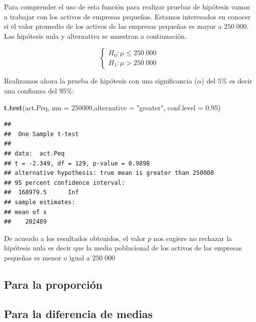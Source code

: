 \documentclass[letterpaper,]{book}
\newenvironment{Shaded}{\begin{snugshade}}{\end{snugshade}}
\newcommand{\DataTypeTok}[1]{\textcolor[rgb]{0.13,0.29,0.53}{#1}}
\newcommand{\DecValTok}[1]{\textcolor[rgb]{0.00,0.00,0.81}{#1}}
\newcommand{\FloatTok}[1]{\textcolor[rgb]{0.00,0.00,0.81}{#1}}
\newcommand{\KeywordTok}[1]{\textcolor[rgb]{0.13,0.29,0.53}{\textbf{#1}}}
\newcommand{\NormalTok}[1]{#1}
\newcommand{\StringTok}[1]{\textcolor[rgb]{0.31,0.60,0.02}{#1}}
\begin{document}
Para comprender el uso de esta función para realizar pruebas de hipótesis vamos a trabajar con los activos de empresas pequeñas. Estamos interesados en conocer si el valor promedio de los activos de las empresas pequeñas es mayor a \(250\;000\). Las hipótesis nula y alternativa se muestran a continuación.

\begin{equation} 
\begin{cases} 
H_0: \mu \leq 250\;000 \\ 
H_1: \mu > 250\;000
\end{cases} 
\end{equation}

Realizamos ahora la prueba de hipótesis con una significancia (\(\alpha\)) del \(5\%\) es decir una confianza del \(95\%\):

\begin{Shaded}
\begin{Highlighting}[]
\KeywordTok{t.test}\NormalTok{(act.Peq, }\DataTypeTok{mu =} \DecValTok{250000}\NormalTok{,}\DataTypeTok{alternative =} \StringTok{"greater"}\NormalTok{,  }\DataTypeTok{conf.level =} \FloatTok{0.95}\NormalTok{)}
\end{Highlighting}
\end{Shaded}

\begin{verbatim}
## 
##  One Sample t-test
## 
## data:  act.Peq
## t = -2.349, df = 129, p-value = 0.9898
## alternative hypothesis: true mean is greater than 250000
## 95 percent confidence interval:
##  168979.5      Inf
## sample estimates:
## mean of x 
##    202489
\end{verbatim}

De acuerdo a los resultados obtenidos, el valor \(p\) nos sugiere no rechazar la hipótesis nula es decir que la media poblacional de los activos de las empresas pequeñas es menor o igual a \(250\;000\)

\hypertarget{para-la-proporcion-1}{%
\subsection{Para la proporción}\label{para-la-proporcion-1}}

\hypertarget{para-la-diferencia-de-medias}{%
\subsection{Para la diferencia de medias}\label{para-la-diferencia-de-medias}}
\end{document}
